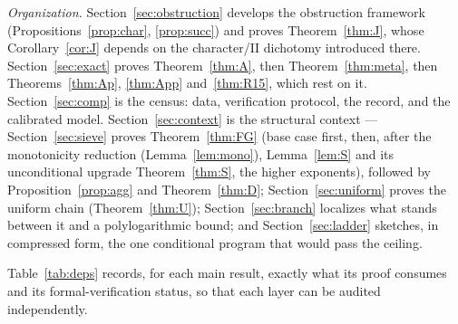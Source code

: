 \documentclass[11pt]{article}
\theoremstyle{plain}
\theoremstyle{remark}
\theoremstyle{plain}
\numberwithin{equation}{section}
\begin{document}
\emph{Organization.}
Section~\ref{sec:obstruction} develops the obstruction framework
(Propositions~\ref{prop:char}, \ref{prop:succ}) and proves
Theorem~\ref{thm:J}, whose Corollary~\ref{cor:J} depends on the
character/II dichotomy introduced there.
Section~\ref{sec:exact} proves Theorem~\ref{thm:A}, then
Theorem~\ref{thm:meta}, then Theorems~\ref{thm:Ap}, \ref{thm:App}
and~\ref{thm:R15}, which rest on it. Section~\ref{sec:comp} is the
census: data, verification protocol, the record, and the calibrated
model. Section~\ref{sec:context} is the structural context ---
Section~\ref{sec:sieve} proves
Theorem~\ref{thm:FG} (base case first, then, after the monotonicity
reduction (Lemma~\ref{lem:mono}), Lemma~\ref{lem:S} and its
unconditional upgrade Theorem~\ref{thm:S}, the higher
exponents), followed by Proposition~\ref{prop:agg} and
Theorem~\ref{thm:D}; Section~\ref{sec:uniform} proves the uniform
chain (Theorem~\ref{thm:U}); Section~\ref{sec:branch} localizes
what stands between it and a polylogarithmic bound; and
Section~\ref{sec:ladder} sketches, in compressed form, the one
conditional program that would pass the ceiling.

Table~\ref{tab:deps} records, for each main result, exactly what its
proof consumes and its formal-verification status, so that each layer
can be audited independently.
\end{document}
